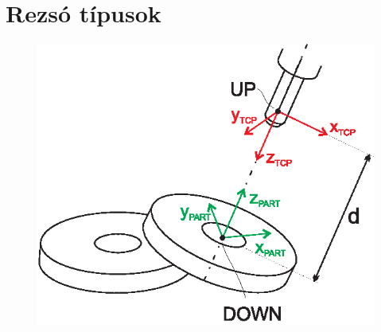 \chapter{Rezsó típusok}

\begin{figure}[ht!]
	\centering
	\includegraphics[width=0.7\linewidth]{img/trans_example-1}
	\caption{}
	\label{fig:transexample-1}
\end{figure}
